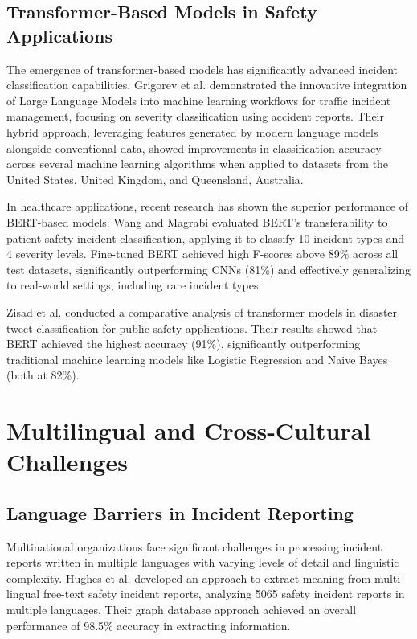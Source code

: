 \documentclass[11pt, titlepage, bibliography=totoc]{scrreprt}
\begin{document}
\subsection{Transformer-Based Models in Safety Applications}
The emergence of transformer-based models has significantly advanced incident classification capabilities. Grigorev et al. \cite{grigorev2024} demonstrated the innovative integration of Large Language Models into machine learning workflows for traffic incident management, focusing on severity classification using accident reports. Their hybrid approach, leveraging features generated by modern language models alongside conventional data, showed improvements in classification accuracy across several machine learning algorithms when applied to datasets from the United States, United Kingdom, and Queensland, Australia.

In healthcare applications, recent research has shown the superior performance of BERT-based models. Wang and Magrabi \cite{Ying} evaluated BERT's transferability to patient safety incident classification, applying it to classify 10 incident types and 4 severity levels. Fine-tuned BERT achieved high F-scores above 89\% across all test datasets, significantly outperforming CNNs (81\%) and effectively generalizing to real-world settings, including rare incident types.

Zisad et al. \cite{zisad2025} conducted a comparative analysis of transformer models in disaster tweet classification for public safety applications. Their results showed that BERT achieved the highest accuracy (91\%), significantly outperforming traditional machine learning models like Logistic Regression and Naive Bayes (both at 82\%).

\section{Multilingual and Cross-Cultural Challenges}

\subsection{Language Barriers in Incident Reporting}
Multinational organizations face significant challenges in processing incident reports written in multiple languages with varying levels of detail and linguistic complexity. Hughes et al. \cite{hughes2019} developed an approach to extract meaning from multi-lingual free-text safety incident reports, analyzing 5065 safety incident reports in multiple languages. Their graph database approach achieved an overall performance of 98.5\% accuracy in extracting information.
\end{document}
